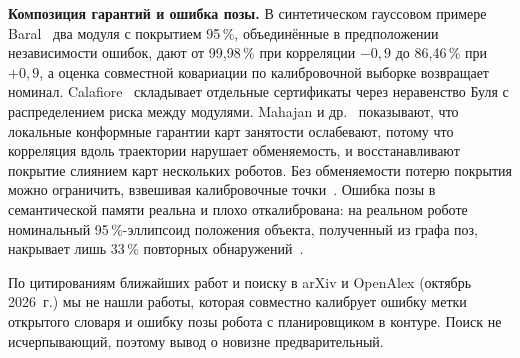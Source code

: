 \textbf{Композиция гарантий и ошибка позы.} В синтетическом гауссовом примере Baral~\cite{baral} два модуля с покрытием 95\,\%, объединённые в предположении независимости ошибок, дают от 99,98\,\% при корреляции $-0{,}9$ до 86,46\,\% при $+0{,}9$, а оценка совместной ковариации по калибровочной выборке возвращает номинал. Calafiore~\cite{calafiore2026} складывает отдельные сертификаты через неравенство Буля с распределением риска между модулями. Mahajan и др.~\cite{mahajan} показывают, что локальные конформные гарантии карт занятости ослабевают, потому что корреляция вдоль траектории нарушает обменяемость, и восстанавливают покрытие слиянием карт нескольких роботов. Без обменяемости потерю покрытия можно ограничить, взвешивая калибровочные точки~\cite{barber2023}. Ошибка позы в семантической памяти реальна и плохо откалибрована: на реальном роботе номинальный 95\,\%-эллипсоид положения объекта, полученный из графа поз, накрывает лишь 33\,\% повторных обнаружений~\cite{pposemem}.

По цитированиям ближайших работ и поиску в arXiv и OpenAlex (октябрь 2026~г.) мы не нашли работы, которая совместно калибрует ошибку метки открытого словаря и ошибку позы робота с планировщиком в контуре. Поиск не исчерпывающий, поэтому вывод о новизне предварительный.
